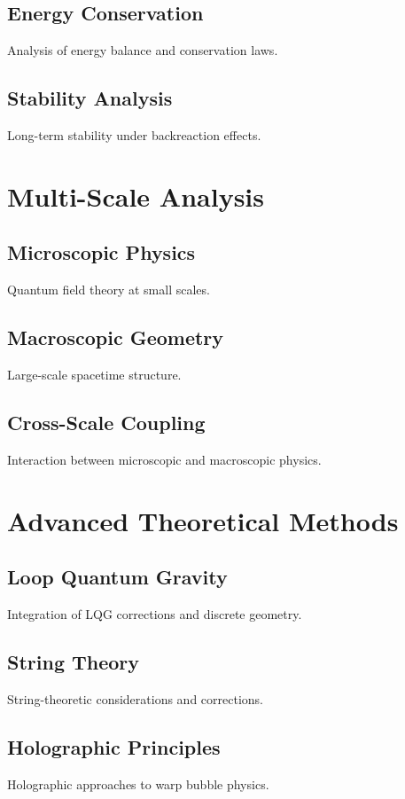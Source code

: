\documentclass{article}
\begin{document}
\subsection{Energy Conservation}
Analysis of energy balance and conservation laws.

\subsection{Stability Analysis}
Long-term stability under backreaction effects.

\section{Multi-Scale Analysis}

\subsection{Microscopic Physics}
Quantum field theory at small scales.

\subsection{Macroscopic Geometry}
Large-scale spacetime structure.

\subsection{Cross-Scale Coupling}
Interaction between microscopic and macroscopic physics.

\section{Advanced Theoretical Methods}

\subsection{Loop Quantum Gravity}
Integration of LQG corrections and discrete geometry.

\subsection{String Theory}
String-theoretic considerations and corrections.

\subsection{Holographic Principles}
Holographic approaches to warp bubble physics.
\end{document}
